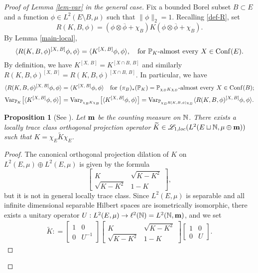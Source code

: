 \documentclass[12pt]{paper}
\newtheorem{proposition}[theorem]{Proposition}
\numberwithin{theorem}{section}
\numberwithin{figure}{section}
\numberwithin{equation}{section}
\begin{document}
\begin{proof}[Proof of Lemma \ref{lem-var} in the general case]

Fix a bounded Borel subset $B\subset E$ and a function $\phi \in L^2(E\setminus B, \mu)$ such that
$
\| \phi\|_2 = 1.
$
 Recalling \eqref{def-R}, set
\[
R(K, B, \phi) =  (\phi \otimes \overline{\phi} + \chi_B) K (\phi \otimes \overline{\phi} + \chi_B).
\]
By Lemma \ref{main-local},
\[
\langle R(K, B, \phi) ^{[X, \, B]} \phi, \phi \rangle =\langle K^{[X, \, B]} \phi, \phi \rangle, \quad \text{for $\mathbb{P}_K$-almost every $X\in \mathrm{Conf}(E)$.}
\]
By definition, we have $K^{[X, \, B]} =K^{[X\cap B, \, B]}$ and similarly $R(K, B, \phi) ^{[X, \, B]}= R(K, B, \phi) ^{[X\cap B, \, B]}$. In particular, we have
\[
\langle R(K, B, \phi) ^{[X, \, B]} \phi, \phi \rangle =\langle K^{[X, \, B]} \phi, \phi \rangle \quad \text{for $(\pi_B)_{*}(\mathbb{P}_K) = \mathbb{P}_{\chi_B K \chi_B}$-almost every $X\in \mathrm{Conf}(B)$};
\]
\begin{align}\label{many-var}
\mathrm{Var}_{\mathbb{P}_{K}} \big[\langle K^{[X, \, B]} \phi, \phi \rangle \big] = \mathrm{Var}_{\mathbb{P}_{\chi_B K \chi_B}} \big[\langle K^{[X, \, B]} \phi, \phi \rangle \big] =  \mathrm{Var}_{\mathbb{P}_{\chi_B R(K, B, \phi)  \chi_B}}  \langle R(K, B, \phi) ^{[X, \, B]} \phi, \phi \rangle.
\end{align}


\begin{proposition}[{See \cite[Section 3.3]{Lyons-ICM}}]\label{claim-dilation}
Let ${\bf m}$ be the counting measure on $\mathbb{N}$. There  exists a locally trace class orthogonal projection operator $\widetilde{K} \in \mathscr{L}_{1, loc}(L^2(E\sqcup \mathbb{N}, \mu \oplus {\bf m}))$ such that $K = \chi_E \widetilde{K} \chi_E$.
\end{proposition}

\begin{proof}
The canonical orthogonal projection dilation of $K$ on $L^2(E, \mu) \oplus L^2(E, \mu)$ is given by the formula
\[
\left[
\begin{array}{cc}
K & \sqrt{K - K^2}
\\
\sqrt{K-K^2} & 1-K
\end{array}
\right],
\]
but it is not in general locally trace class.
Since $L^2(E, \mu)$ is  separable  and all infinite dimensional separable Hilbert spaces are isometrically isomorphic,  there exists a unitary operator $U: L^2(E, \mu) \rightarrow  \ell^2(\mathbb{N}) = L^2(\mathbb{N}, {\bf m})$, and we set
\begin{align*}
\widetilde{K}: =
\left[
\begin{array}{cc}
1  & 0
\\
0 & U^{-1}
\end{array}
\right]
\left[
\begin{array}{cc}
K & \sqrt{K - K^2}
\\
\sqrt{K-K^2} & 1-K
\end{array}
\right]
\left[
\begin{array}{cc}
1  & 0
\\
0 & U
\end{array}
\right] .
\end{align*}
\end{proof}


\end{proof}
\end{document}
